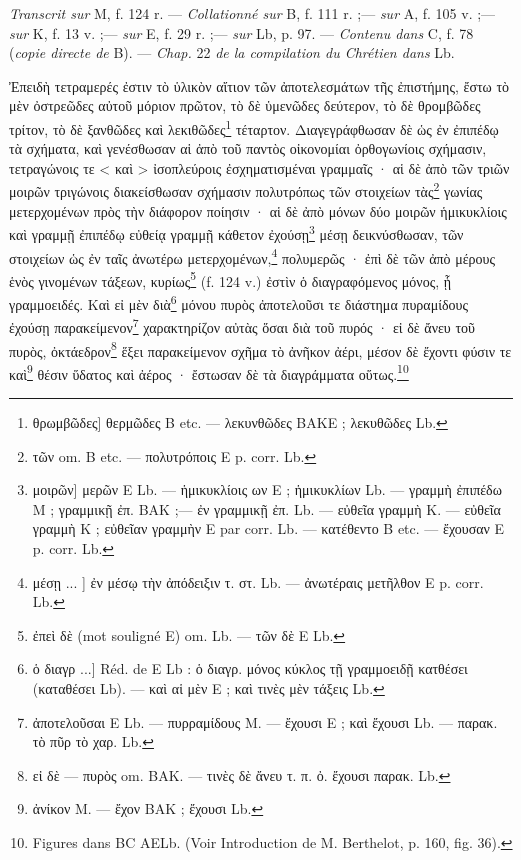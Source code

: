 \documentclass[a4paper, 11pt, oneside, polutonikogreek, french]{article}
\begin{document}
\emph{Transcrit sur} M, f. 124 r. --- \emph{Collationné sur} B, f. 111 r. ;--- \emph{sur} A, f. 105 v. ;---
\emph{sur} K, f. 13 v. ;--- \emph{sur} E, f. 29 r. ;--- \emph{sur} Lb, p. 97. --- \emph{Contenu dans} C, f. 78 (\emph{copie
directe de} B). --- \emph{Chap.} 22 \emph{de la compilation du Chrétien dans} Lb.

\bigskip

Ἐπειδὴ τετραμερές ἐστιν τὸ ὑλικὸν αἴτιον τῶν ἀποτελεσμάτων τῆς ἐπιστήμης, ἔστω τὸ μὲν ὀστρεῶδες αὐτοῦ μόριον πρῶτον, τὸ δὲ ὑμενῶδες δεύτερον, τὸ δὲ θρομβῶδες τρίτον, τὸ δὲ ξανθῶδες καὶ λεκιθῶδες\footnote{θρωμβῶδες] θερμῶδες B etc. --- λεκυνθῶδες BAKE ; λεκυθῶδες Lb.} τέταρτον. Διαγεγράφθωσαν δὲ ὡς ἐν ἐπιπέδῳ τὰ σχήματα, καὶ γενέσθωσαν αἱ ἀπὸ τοῦ παντὸς οἰκονομίαι ὀρθογωνίοις σχήμασιν, τετραγώνοις τε < καὶ > ἰσοπλεύροις ἐσχηματισμέναι γραμμαῖς · αἱ δὲ ἀπὸ τῶν τριῶν μοιρῶν τριγώνοις διακείσθωσαν σχήμασιν πολυτρόπως τῶν στοιχείων τὰς\footnote{τῶν om. B etc. --- πολυτρόποις E p. corr. Lb.} γωνίας μετερχομένων πρὸς τὴν διάφορον ποίησιν · αἱ δὲ ἀπὸ μόνων δύο μοιρῶν ἡμικυκλίοις καὶ γραμμῇ ἐπιπέδῳ εὐθείᾳ γραμμῇ κάθετον ἐχούσῃ\footnote{μοιρῶν] μερῶν E Lb. --- ἡμικυκλίοις ων E ; ἡμικυκλίων Lb. --- γραμμὴ ἐπιπέδω M ; γραμμικῇ ἐπ. BAK ;--- ἐν γραμμικῇ ἐπ. Lb. --- εὐθεῖα γραμμὴ K. --- εὐθεῖα γραμμὴ K ; εὐθεῖαν γραμμὴν E par corr. Lb. --- κατέθεντο B etc. --- ἔχουσαν E p. corr. Lb.} μέσῃ δεικνύσθωσαν, τῶν στοιχείων ὡς ἐν ταῖς ἀνωτέρω μετερχομένων,\footnote{μέσῃ ... ] ἐν μέσῳ τὴν ἀπόδειξιν τ. στ. Lb. --- ἀνωτέραις μετῆλθον E p. corr. Lb.} πολυμερῶς · ἐπὶ δὲ τῶν ἀπὸ μέρους ἑνὸς γινομένων τάξεων, κυρίως\footnote{ἐπεὶ δὲ (mot souligné E) om. Lb. --- τῶν δὲ E Lb.} (f. 124 v.) ἐστὶν ὁ διαγραφόμενος μόνος, ᾗ γραμμοειδές. Καὶ εἰ μὲν διὰ\footnote{ὁ διαγρ ...] Réd. de E Lb : ὁ διαγρ. μόνος κύκλος τῇ γραμμοειδῇ κατθέσει (καταθέσει Lb). --- καὶ αἱ μὲν E ; καὶ τινὲς μὲν τάξεις Lb.} μόνου πυρὸς ἀποτελοῦσι τε διάστημα πυραμίδους ἐχούσῃ παρακείμενον\footnote{ἀποτελοῦσαι E Lb. --- πυρραμίδους M. --- ἔχουσι E ; καὶ ἔχουσι Lb. --- παρακ. τὸ πῦρ τὸ χαρ. Lb.} χαρακτηρίζον αὐτὰς ὅσαι διὰ τοῦ πυρός · εἰ δὲ ἄνευ τοῦ πυρὸς, ὀκτάεδρον\footnote{εἰ δὲ --- πυρὸς om. BAK. --- τινὲς δὲ ἄνευ τ. π. ὀ. ἔχουσι παρακ. Lb.} ἕξει παρακείμενον σχῆμα τὸ ἀνῆκον ἀέρι, μέσον δὲ ἔχοντι φύσιν τε καὶ\footnote{ἀνίκον M. --- ἔχον BAK ; ἔχουσι Lb.} θέσιν ὕδατος καὶ ἀέρος · ἔστωσαν δὲ τὰ διαγράμματα οὕτως.\footnote{Figures dans BC AELb. (Voir Introduction de M. Berthelot, p. 160, fig. 36).}

\bigskip
\centerline{\EightStarTaper}
\centerline{\EightStarTaper\EightStarTaper}
\bigskip
\end{document}
